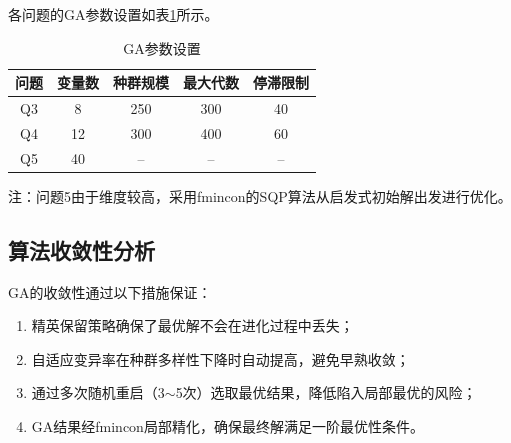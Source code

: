 各问题的GA参数设置如表\ref{tab:ga_params}所示。

\begin{table}[H]
    \centering
    \caption{GA参数设置}
    \label{tab:ga_params}
    \begin{tabular}{ccccc}
        \toprule
        \textbf{问题} & \textbf{变量数} & \textbf{种群规模} & \textbf{最大代数} & \textbf{停滞限制} \\
        \midrule
        Q3 & 8 & 250 & 300 & 40 \\
        Q4 & 12 & 300 & 400 & 60 \\
        Q5 & 40 & -- & -- & -- \\
        \bottomrule
    \end{tabular}
\end{table}

注：问题5由于维度较高，采用fmincon的SQP算法从启发式初始解出发进行优化。

\subsection{算法收敛性分析}

GA的收敛性通过以下措施保证：
\begin{enumerate}[label=(\arabic*)]
    \item 精英保留策略确保了最优解不会在进化过程中丢失；
    \item 自适应变异率在种群多样性下降时自动提高，避免早熟收敛；
    \item 通过多次随机重启（3$\sim$5次）选取最优结果，降低陷入局部最优的风险；
    \item GA结果经fmincon局部精化，确保最终解满足一阶最优性条件。
\end{enumerate}

